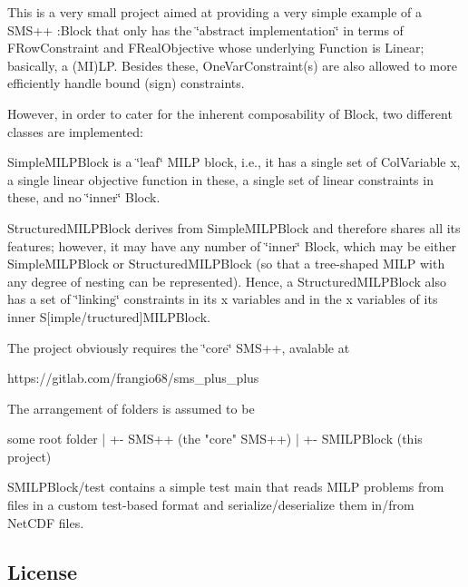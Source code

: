 This is a very small project aimed at providing a very simple example of a S\+M\+S++ \+:Block that only has the \char`\"{}abstract implementation\char`\"{} in terms of F\+Row\+Constraint and F\+Real\+Objective whose underlying Function is Linear; basically, a (MI)LP. Besides these, One\+Var\+Constraint(s) are also allowed to more efficiently handle bound (sign) constraints.

However, in order to cater for the inherent composability of Block, two different classes are implemented\+:


\begin{DoxyItemize}
\item Simple\+M\+I\+L\+P\+Block is a \char`\"{}leaf\char`\"{} M\+I\+LP block, i.\+e., it has a single set of Col\+Variable x, a single linear objective function in these, a single set of linear constraints in these, and no \char`\"{}inner\char`\"{} Block.
\item Structured\+M\+I\+L\+P\+Block derives from Simple\+M\+I\+L\+P\+Block and therefore shares all its features; however, it may have any number of \char`\"{}inner\char`\"{} Block, which may be either Simple\+M\+I\+L\+P\+Block or Structured\+M\+I\+L\+P\+Block (so that a tree-\/shaped M\+I\+LP with any degree of nesting can be represented). Hence, a Structured\+M\+I\+L\+P\+Block also has a set of \char`\"{}linking\char`\"{} constraints in its x variables and in the x variables of its inner S\mbox{[}imple/tructured\mbox{]}M\+I\+L\+P\+Block.
\end{DoxyItemize}

The project obviously requires the \char`\"{}core\char`\"{} S\+M\+S++, avalable at \begin{DoxyVerb}https://gitlab.com/frangio68/sms_plus_plus
\end{DoxyVerb}


The arrangement of folders is assumed to be \begin{DoxyVerb}some root folder
 |
 +- SMS++ (the "core" SMS++)
 |
 +- SMILPBlock (this project)
\end{DoxyVerb}


S\+M\+I\+L\+P\+Block/test contains a simple test main that reads M\+I\+LP problems from files in a custom test-\/based format and serialize/deserialize them in/from Net\+C\+DF files.

\subsection*{License }

